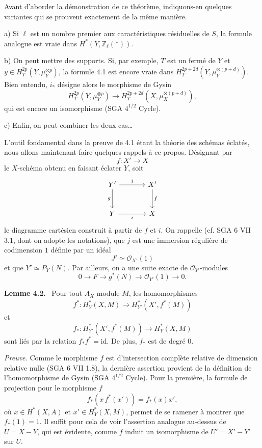 \documentclass[11pt]{article}
\newenvironment{statement}[1]{\par\medskip\noindent\textbf{#1.}\ }{\par\medskip}
\begin{document}
Avant d'aborder la démonstration de ce théorème, indiquons-en quelques variantes qui se prouvent exactement de la même manière.

a) Si $\ell$ est un nombre premier aux caractéristiques résiduelles de $S$, la formule analogue est vraie dans $H^*(Y,\mathbb Z_\ell(*))$.

b) On peut mettre des supports. Si, par exemple, $T$ est un fermé de $Y$ et $y\in H_T^{2p}(Y,\mu_Y^{\otimes p})$, la formule 4.1 est encore vraie dans $H_T^{2p+2d}(Y,\mu_Y^{\otimes(p+d)})$. Bien entendu, $i_*$ désigne alors le morphisme de Gysin
\[
H_T^{2p}(Y,\mu_Y^{\otimes p})
\to H_T^{2p+2d}(X,\mu_X^{\otimes(p+d)}),
\]
qui est encore un isomorphisme (SGA $4^{1/2}$ Cycle).

c) Enfin, on peut combiner les deux cas\dots

L'outil fondamental dans la preuve de 4.1 étant la théorie des schémas éclatés, nous allons maintenant faire quelques rappels à ce propos. Désignant par
\[
f:X'\to X
\]
le $X$-schéma obtenu en faisant éclater $Y$, soit
\[
\begin{tikzcd}[column sep=large,row sep=large]
Y' \arrow[r,"j"] \arrow[d,"g"'] & X' \arrow[d,"f"]\\
Y \arrow[r,"i"'] & X
\end{tikzcd}
\]
le diagramme cartésien construit à partir de $f$ et $i$. On rappelle (cf. SGA 6 VII 3.1, dont on adopte les notations), que $j$ est une immersion régulière de codimension $1$ définie par un idéal
\[
J'\simeq\mathcal O_{X'}(1)
\]
et que $Y'\simeq P_Y(N)$. Par ailleurs, on a une suite exacte de $\mathcal O_{Y'}$-modules
\[
0\to F\to g^*(N)\to \mathcal O_{Y'}(1)\to0.
\]

\begin{statement}{Lemme 4.2}
Pour tout $A_X$-module $M$, les homomorphismes
\[
f^*:H_Y^*(X,M)\to H_{Y'}^*(X',f^*(M))
\]
et
\[
f_*:H_{Y'}^*(X',f^*(M))\to H_Y^*(X,M)
\]
sont liés par la relation $f_*f^*=\mathrm{id}$. De plus, $f_*$ est de degré $0$.
\end{statement}

\emph{Preuve.} Comme le morphisme $f$ est d'intersection complète relative de dimension relative nulle (SGA 6 VII 1.8), la dernière assertion provient de la définition de l'homomorphisme de Gysin (SGA $4^{1/2}$ Cycle). Pour la première, la formule de projection pour le morphisme $f$
\[
f_*(x\,f^*(x'))=f_*(x)x',
\]
où $x\in H^*(X,A)$ et $x'\in H_Y^*(X,M)$, permet de se ramener à montrer que $f_*(1)=1$. Il suffit pour cela de voir l'assertion analogue au-dessus de $U=X-Y$, qui est évidente, comme $f$ induit un isomorphisme de $U'=X'-Y'$ sur $U$.
\end{document}
